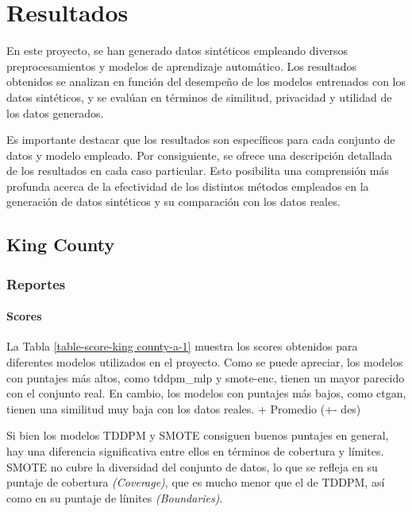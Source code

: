 \chapter{Resultados}
En este proyecto, se han generado datos sintéticos empleando diversos preprocesamientos y modelos de aprendizaje automático. Los resultados obtenidos se analizan en función del desempeño de los modelos entrenados con los datos sintéticos, y se evalúan en términos de similitud, privacidad y utilidad de los datos generados.

Es importante destacar que los resultados son específicos para cada conjunto de datos y modelo empleado. Por consiguiente, se ofrece una descripción detallada de los resultados en cada caso particular. Esto posibilita una comprensión más profunda acerca de la efectividad de los distintos métodos empleados en la generación de datos sintéticos y su comparación con los datos reales.

\newpage
\section{King County}

\subsection{Reportes}

\subsubsection{Scores}

La Tabla \ref{table-score-king county-a-1} muestra los scores obtenidos para diferentes modelos utilizados en el proyecto. Como se puede apreciar, los modelos con puntajes más altos, como tddpm\_mlp y smote-enc, tienen un mayor parecido con el conjunto real. En cambio, los modelos con puntajes más bajos, como ctgan, tienen una similitud muy baja con los datos reales.
+ Promedio (+- des)







Si bien los modelos TDDPM y SMOTE consiguen buenos puntajes en general, hay una diferencia significativa entre ellos en términos de cobertura y límites. SMOTE no cubre la diversidad del conjunto de datos, lo que se refleja en su puntaje de cobertura \emph{(Coverage)}, que es mucho menor que el de TDDPM, así como en su puntaje de límites \emph{(Boundaries)}.
\newpage
